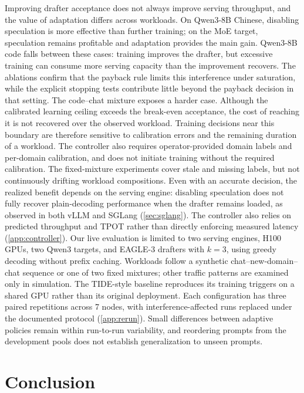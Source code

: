 \documentclass{article}
\begin{document}
Improving drafter acceptance does not always improve serving throughput, and the value of adaptation differs across workloads. On Qwen3-8B Chinese, disabling speculation is more effective than further training; on the MoE target, speculation remains profitable and adaptation provides the main gain. Qwen3-8B code falls between these cases: training improves the drafter, but excessive training can consume more serving capacity than the improvement recovers. The ablations confirm that the payback rule limits this interference under saturation, while the explicit stopping tests contribute little beyond the payback decision in that setting. The code--chat mixture exposes a harder case. Although the calibrated learning ceiling exceeds the break-even acceptance, the cost of reaching it is not recovered over the observed workload. Training decisions near this boundary are therefore sensitive to calibration errors and the remaining duration of a workload. The controller also requires operator-provided domain labels and per-domain calibration, and does not initiate training without the required calibration. The fixed-mixture experiments cover stale and missing labels, but not continuously drifting workload compositions. Even with an accurate decision, the realized benefit depends on the serving engine: disabling speculation does not fully recover plain-decoding performance when the drafter remains loaded, as observed in both vLLM and SGLang (\cref{sec:sglang}). The controller also relies on predicted throughput and TPOT rather than directly enforcing measured latency (\cref{app:controller}). Our live evaluation is limited to two serving engines, H100 GPUs, two Qwen3 targets, and EAGLE-3 drafters with $k{=}3$, using greedy decoding without prefix caching. Workloads follow a synthetic chat--new-domain--chat sequence or one of two fixed mixtures; other traffic patterns are examined only in simulation. The TIDE-style baseline reproduces its training triggers on a shared GPU rather than its original deployment. Each configuration has three paired repetitions across 7 nodes, with interference-affected runs replaced under the documented protocol (\cref{app:rerun}). Small differences between adaptive policies remain within run-to-run variability, and reordering prompts from the development pools does not establish generalization to unseen prompts.


\section{Conclusion}\label{sec:conclusion}
\end{document}
